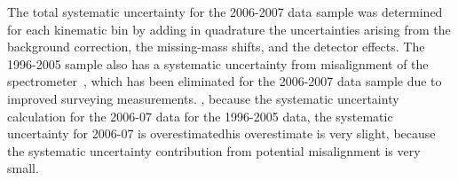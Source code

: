 The total systematic uncertainty for the 2006-2007 data sample was
determined for each kinematic bin by adding in quadrature the
  uncertainties arising from the background correction, the
  missing-mass shifts, and the detector effects.  The 1996-2005 sample also has a systematic uncertainty from misalignment of the spectrometer~\cite{Air09}, which has been eliminated for the 2006-2007 data sample due to improved
  surveying measurements. , because the systematic uncertainty calculation for the 2006-07 data  for the 1996-2005 data, the systematic uncertainty for 2006-07 is overestimatedhis overestimate is very slight, because the systematic uncertainty contribution from potential misalignment  is very small.

